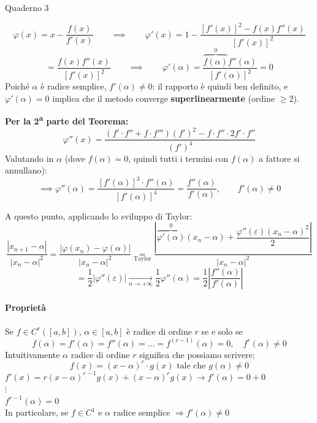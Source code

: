\documentclass[12pt,a4paper,]{report}
\begin{document}
\noindent
Quaderno 3

\begin{dimostrazione}
    \[
    \varphi(x) = x - \frac{f(x)}{f'(x)} \qquad \implies \qquad \varphi'(x) = 1 - \frac{[f'(x)]^2 - f(x)f''(x)}{[f'(x)]^2}
    \]
    \[
    = \frac{f(x)f''(x)}{[f'(x)]^2}
    \qquad \implies \qquad
    \varphi'(\alpha) = \frac{\overbrace{f(\alpha)}^{0}f''(\alpha)}{[f'(\alpha)]^2} = 0
    \]
    Poiché $\alpha$ è radice semplice, $f'(\alpha)\neq 0$: il rapporto è quindi ben definito, e $\varphi'(\alpha)=0$ implica che il metodo converge \textbf{superlinearmente} (ordine $\geq 2$).

    \bigskip
    \noindent
    \textbf{Per la 2\textsuperscript{a} parte del Teorema:}
    \[
    \varphi''(x) = \frac{(f'\cdot f'' + f\cdot f''')(f')^2 - f\cdot f''\cdot 2f'\cdot f''}{(f')^4}
    \]
    Valutando in $\alpha$ (dove $f(\alpha)=0$, quindi tutti i termini con $f(\alpha)$ a fattore si annullano):
    \[
    \implies \varphi''(\alpha) = \frac{[f'(\alpha)]^3\cdot f''(\alpha)}{[f'(\alpha)]^4} = \frac{f''(\alpha)}{f'(\alpha)}, \qquad f'(\alpha)\neq 0
    \]

    \bigskip
    \noindent
    A questo punto, applicando lo sviluppo di Taylor:
    \[
    \frac{|x_{n+1}-\alpha|}{|x_n-\alpha|^2} = \frac{|\varphi(x_n)-\varphi(\alpha)|}{|x_n-\alpha|^2} \underset{\text{Taylor}}{=} \frac{\left|\overbrace{\varphi'(\alpha)}^{0}(x_n-\alpha) + \dfrac{\varphi''(\varepsilon)(x_n-\alpha)^2}{2}\right|}{|x_n-\alpha|^2}
    \]
    \[
    = \frac{1}{2}|\varphi''(\varepsilon)| \xrightarrow[n\to+\infty]{} \frac{1}{2}\varphi''(\alpha) = \frac{1}{2}\left|\frac{f''(\alpha)}{f'(\alpha)}\right|
    \]
\end{dimostrazione}

\paragraph{Proprietà}
Se $f \in C^r([a, b])$, $\alpha \in [a, b]$ è radice di ordine $r$ se e solo se
\[
f(\alpha) = f'(\alpha) = f''(\alpha) = \ldots = f^{(r-1)}(\alpha) = 0, \quad f^r(\alpha) \neq 0
\]
Intuitivamente $\alpha$ radice di ordine $r$ significa che possiamo scrivere;
\[
f(x) = (x - \alpha)^r \cdot g(x) \text{ tale che } g(\alpha) \neq 0
\]
$f'(x) = r(x-\alpha)^{r-1}g(x) + (x-\alpha)^r g(x) \to f'(\alpha) = 0 + 0$\\
$\vdots$\\
$f^{r-1}(\alpha) = 0$\\
In particolare, se $f \in C^1$ e $\alpha$ radice semplice $\Longrightarrow f'(\alpha) \neq 0$
\end{document}
